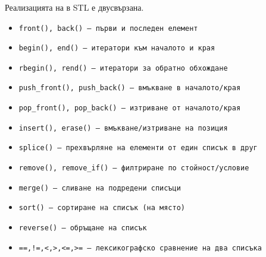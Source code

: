 \documentclass[alsotrans]{beamerswitch}
\begin{document}
\begin{frame}
  \frametitle{}
  \small
  Реализацията на  в STL е двусвързана.
  \begin{itemize}
  \item \tt{front()}, \tt{back()} --- първи и последен елемент
  \item \tt{begin()}, \tt{end()} --- итератори към началото и края
  \item \tt{rbegin()}, \tt{rend()} --- итератори за обратно обхождане
  \item \tt{push\_front()}, \tt{push\_back()} --- вмъкване в началото/края
  \item \tt{pop\_front()}, \tt{pop\_back()} --- изтриване от началото/края
  \item \tt{insert()}, \tt{erase()} --- вмъкване/изтриване на позиция
  \item \tt{splice()} --- прехвърляне на елементи от един списък в друг
  \item \tt{remove()}, \tt{remove\_if()} --- филтриране по стойност/условие
  \item \tt{merge()} --- сливане на подредени списъци
  \item \tt{sort()} --- сортиране на списък (на място)
  \item \tt{reverse()} --- обръщане на списък
  \item \tt{==,!=,<,>,<=,>=} --- лексикографско сравнение на два списъка
  \end{itemize}
\end{frame}
\end{document}
